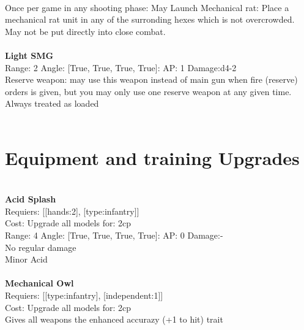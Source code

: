 \ \\
Once per game in any shooting phase: May Launch Mechanical rat: Place a mechanical rat unit in any of the surronding hexes which is not overcrowded. May not be put directly into close combat. \\ 

\ \\
{\bf Light SMG } \\



Range: 2  Angle: [True, True, True, True]: AP: 1 Damage:d4-2 \\
Reserve weapon: may use this weapon instead of main gun when fire (reserve) orders is given, but you may only use one reserve weapon at any given time.\\ 
Always treated as loaded\\ 




 
\ \\

\section{Equipment and training Upgrades}\ \\
{\bf Acid Splash } \\

Requiers: [[hands:2], [type:infantry]] \\
Cost: Upgrade all models for: 2cp \\


Range: 4  Angle: [True, True, True, True]: AP: 0 Damage:- \\
No regular damage\\ 
Minor Acid\\ 








\ \\
{\bf Mechanical Owl } \\

Requiers: [[type:infantry], [independent:1]] \\
Cost: Upgrade all models for: 2cp \\
Gives all weapons the enhanced accurazy (+1 to hit) trait\\ 









